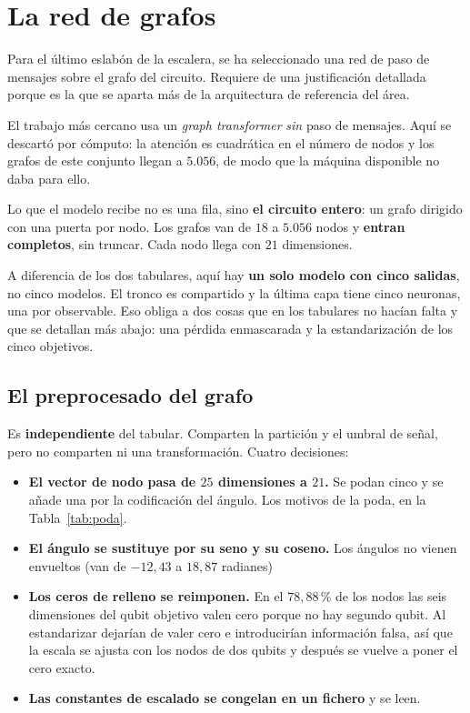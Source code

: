 \section{La red de grafos}
\label{sec:gnn}

Para el último eslabón de la escalera, se ha seleccionado una red de paso de mensajes sobre el grafo del circuito. Requiere de una justificación detallada porque es la que se aparta más de la arquitectura de referencia del área.

El trabajo más cercano \cite{bao2025gtraqem} usa un
\textit{graph transformer} \emph{sin} paso de mensajes. Aquí se descartó por cómputo: la
atención es cuadrática en el número de nodos y los grafos de este conjunto llegan a $5{.}056$,
de modo que la máquina disponible no daba para ello.

Lo que el modelo recibe no es una fila, sino \textbf{el circuito entero}: un grafo dirigido con una puerta por nodo. Los
grafos van de $18$ a $5{.}056$ nodos y
\textbf{entran completos}, sin truncar. Cada nodo llega con $21$ dimensiones.

A diferencia de los dos tabulares, aquí hay \textbf{un solo modelo con cinco salidas}, no cinco
modelos. El tronco es compartido y la última capa tiene cinco neuronas, una por observable.
Eso obliga a dos cosas que en los tabulares no hacían falta y que se detallan más abajo: una
pérdida enmascarada y la estandarización de los cinco objetivos.

\subsection*{El preprocesado del grafo}

Es \textbf{independiente} del tabular. Comparten la partición y el umbral de señal, pero no
comparten ni una transformación. Cuatro decisiones:

\begin{itemize}
    \item \textbf{El vector de nodo pasa de $25$ dimensiones a $21$.} Se podan cinco y se añade
          una por la codificación del ángulo. Los motivos de la poda, en la
          Tabla~\ref{tab:poda}.
    \item \textbf{El ángulo se sustituye por su seno y su coseno.} Los ángulos no vienen
          envueltos (van de $-12{,}43$ a $18{,}87$ radianes)
    \item \textbf{Los ceros de relleno se reimponen.} En el $78{,}88$\,\% de los nodos las seis
          dimensiones del qubit objetivo valen cero porque no hay segundo qubit. Al
          estandarizar dejarían de valer cero e introducirían información falsa, así que la
          escala se ajusta con los nodos de dos qubits y después se vuelve a poner el cero
          exacto.
    \item \textbf{Las constantes de escalado se congelan en un fichero} y se leen.
\end{itemize}

